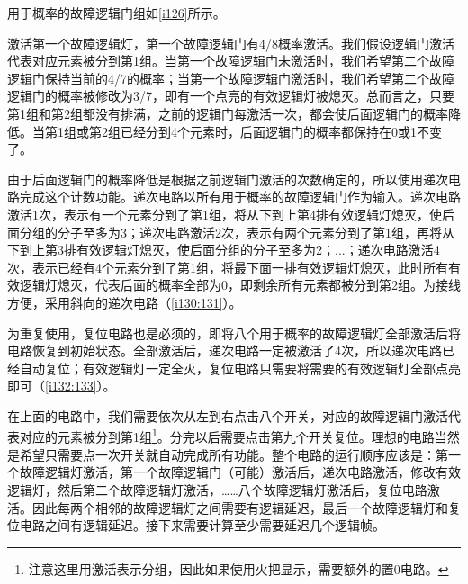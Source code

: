 用于概率的故障逻辑门组如\autoref{i126}所示。

\begin{figure}[!ht]
  \centering
  \caption{}
  \label{i126}
\end{figure}

激活第一个故障逻辑灯，第一个故障逻辑门有4/8概率激活。我们假设逻辑门激活代表对应元素被分到第1组。当第一个故障逻辑门未激活时，我们希望第二个故障逻辑门保持当前的4/7的概率；当第一个故障逻辑门激活时，我们希望第二个故障逻辑门的概率被修改为3/7，即有一个点亮的有效逻辑灯被熄灭。总而言之，只要第1组和第2组都没有排满，之前的逻辑门每激活一次，都会使后面逻辑门的概率降低。当第1组或第2组已经分到4个元素时，后面逻辑门的概率都保持在0或1不变了。

由于后面逻辑门的概率降低是根据之前逻辑门激活的次数确定的，所以使用递次电路完成这个计数功能。递次电路以所有用于概率的故障逻辑门作为输入。递次电路激活1次，表示有一个元素分到了第1组，将从下到上第4排有效逻辑灯熄灭，使后面分组的分子至多为3；递次电路激活2次，表示有两个元素分到了第1组，再将从下到上第3排有效逻辑灯熄灭，使后面分组的分子至多为2；...；递次电路激活4次，表示已经有4个元素分到了第1组，将最下面一排有效逻辑灯熄灭，此时所有有效逻辑灯熄灭，代表后面的概率全部为0，即剩余所有元素都被分到第2组。为接线方便，采用斜向的递次电路（\autoref{i130:131}）。

\begin{figure}[!ht]
  \centering
  \caption{}
  \label{i130:131}
\end{figure}

为重复使用，复位电路也是必须的，即将八个用于概率的故障逻辑灯全部激活后将电路恢复到初始状态。全部激活后，递次电路一定被激活了4次，所以递次电路已经自动复位；有效逻辑灯一定全灭，复位电路只需要将需要的有效逻辑灯全部点亮即可（\autoref{i132:133}）。

\begin{figure}[!ht]
  \centering
  \caption{}
  \label{i132:133}
\end{figure}

在上面的电路中，我们需要依次从左到右点击八个开关，对应的故障逻辑门激活代表对应的元素被分到第1组\footnote{注意这里用激活表示分组，因此如果使用火把显示，需要额外的置0电路。}。分完以后需要点击第九个开关复位。理想的电路当然是希望只需要点一次开关就自动完成所有功能。整个电路的运行顺序应该是：第一个故障逻辑灯激活，第一个故障逻辑门（可能）激活后，递次电路激活，修改有效逻辑灯，然后第二个故障逻辑灯激活，……八个故障逻辑灯激活后，复位电路激活。因此每两个相邻的故障逻辑灯之间需要有逻辑延迟，最后一个故障逻辑灯和复位电路之间有逻辑延迟。接下来需要计算至少需要延迟几个逻辑帧。

